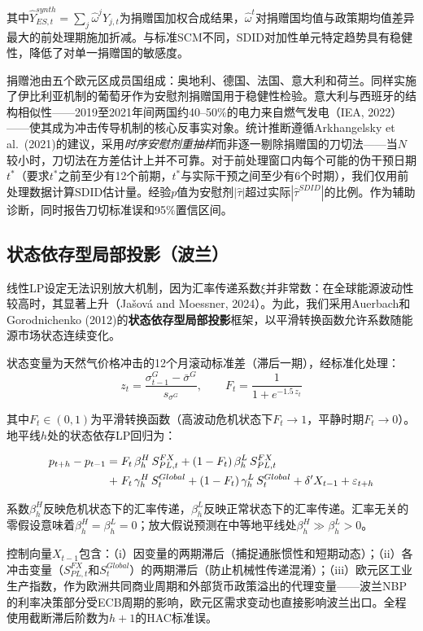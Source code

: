 \documentclass[12pt, a4paper]{article}
\begin{document}
其中$\hat{Y}_{ES,t}^{synth} = \sum_j \hat{\omega}^j Y_{j,t}$为捐赠国加权合成结果，$\hat{\omega}^t$对捐赠国均值与政策期均值差异最大的前处理期施加折减。与标准SCM不同，SDID对加性单元特定趋势具有稳健性，降低了对单一捐赠国的敏感度。

捐赠池由五个欧元区成员国组成：奥地利、德国、法国、意大利和荷兰。同样实施了伊比利亚机制的葡萄牙作为安慰剂捐赠国用于稳健性检验。意大利与西班牙的结构相似性——2019至2021年间两国约40--50\%的电力来自燃气发电（IEA, 2022）——使其成为冲击传导机制的核心反事实对象。统计推断遵循Arkhangelsky et al.\ (2021)的建议，采用\textit{时序安慰剂重抽样}而非逐一剔除捐赠国的刀切法——当$N$较小时，刀切法在方差估计上并不可靠。对于前处理窗口内每个可能的伪干预日期$t^*$（要求$t^*$之前至少有12个前期，$t^*$与实际干预之间至少有6个时期），我们仅用前处理数据计算SDID估计量。经验$p$值为安慰剂$|\hat{\tau}|$超过实际$|\hat{\tau}^{SDID}|$的比例。作为辅助诊断，同时报告刀切标准误和95\%置信区间。


\subsection{状态依存型局部投影（波兰）}

线性LP设定无法识别放大机制，因为汇率传递系数$\xi$并非常数：在全球能源波动性较高时，其显著上升（Ja\v{s}ov\'{a} and Moessner, 2024）。为此，我们采用Auerbach和Gorodnichenko (2012)的\textbf{状态依存型局部投影}框架，以平滑转换函数允许系数随能源市场状态连续变化。

状态变量为天然气价格冲击的12个月滚动标准差（滞后一期），经标准化处理：
\[
z_t = \frac{\sigma_{t-1}^G - \bar{\sigma}^G}{s_{\sigma^G}}, \qquad
F_t = \frac{1}{1 + e^{-1.5\, z_t}}
\]

其中$F_t \in (0,1)$为平滑转换函数（高波动危机状态下$F_t \to 1$，平静时期$F_t \to 0$）。地平线$h$处的状态依存LP回归为：

\begin{align}
p_{t+h} - p_{t-1} =\;
  &F_t\,\beta^{H}_h\, S^{FX}_{PL,t}
  + (1-F_t)\,\beta^{L}_h\, S^{FX}_{PL,t} \notag \\
  +\;&F_t\,\gamma^{H}_h\, S^{Global}_t
  + (1-F_t)\,\gamma^{L}_h\, S^{Global}_t
  + \delta' X_{t-1} + \varepsilon_{t+h}
\end{align}

系数$\beta^{H}_h$反映危机状态下的汇率传递，$\beta^{L}_h$反映正常状态下的汇率传递。汇率无关的零假设意味着$\beta^{H}_h = \beta^{L}_h = 0$；放大假说预测在中等地平线处$\beta^{H}_h \gg \beta^{L}_h > 0$。

控制向量$X_{t-1}$包含：（i）因变量的两期滞后（捕捉通胀惯性和短期动态）；（ii）各冲击变量（$S^{FX}_{PL,t}$和$S^{Global}_t$）的两期滞后（防止机械性传递混淆）；（iii）欧元区工业生产指数，作为欧洲共同商业周期和外部货币政策溢出的代理变量——波兰NBP的利率决策部分受ECB周期的影响，欧元区需求变动也直接影响波兰出口。全程使用截断滞后阶数为$h+1$的HAC标准误。
\end{document}
